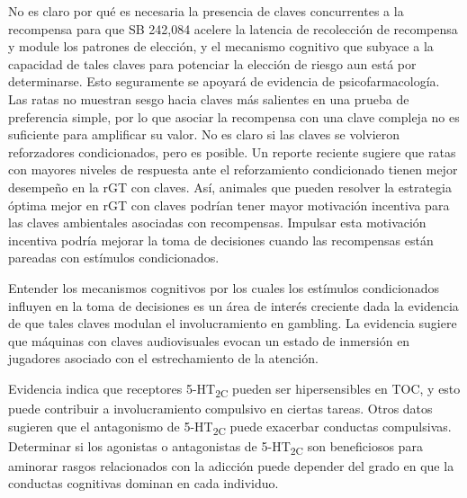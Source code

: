 \documentclass[a4paper,12pt]{article}
\begin{document}
No es claro por qué es necesaria la presencia de claves concurrentes a la recompensa para que SB 242,084 acelere la latencia de recolección de recompensa y module los patrones de elección, y el mecanismo cognitivo que subyace a la capacidad de tales claves para potenciar la elección de riesgo aun está por determinarse. Esto seguramente se apoyará de evidencia de psicofarmacología. Las ratas no muestran sesgo hacia claves más salientes en una prueba de preferencia simple, por lo que asociar la recompensa con una clave compleja no es suficiente para amplificar su valor. No es claro si las claves se volvieron reforzadores condicionados, pero es posible. Un reporte reciente sugiere que ratas con mayores niveles de respuesta ante el reforzamiento condicionado tienen mejor desempeño en la rGT con claves. Así, animales que pueden resolver la estrategia óptima mejor en rGT con claves podrían tener mayor motivación incentiva para las claves ambientales asociadas con recompensas. Impulsar esta motivación incentiva podría mejorar la toma de decisiones cuando las recompensas están pareadas con estímulos condicionados.

Entender los mecanismos cognitivos por los cuales los estímulos condicionados influyen en la toma de decisiones es un área de interés creciente dada la evidencia de que tales claves modulan el involucramiento en gambling. La evidencia sugiere que máquinas con claves audiovisuales evocan un estado de inmersión en jugadores asociado con el estrechamiento de la atención.

Evidencia indica que receptores 5-HT\textsubscript{2C} pueden ser hipersensibles en TOC, y esto puede contribuir a involucramiento compulsivo en ciertas tareas. Otros datos sugieren que el antagonismo de 5-HT\textsubscript{2C} puede exacerbar conductas compulsivas. Determinar si los agonistas o antagonistas de 5-HT\textsubscript{2C} son beneficiosos para aminorar rasgos relacionados con la adicción puede depender del grado en que la conductas cognitivas dominan en cada individuo.
\end{document}
